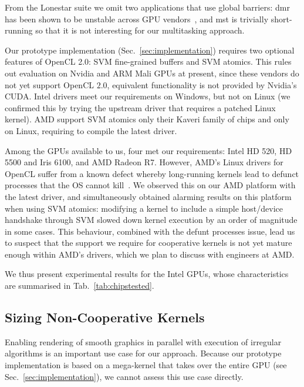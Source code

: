 \documentclass[numbers,nocopyrightspace,10pt]{sigplanconf}
\newcommand{\mytab}{Tab.~}
\newcommand{\mysec}{Sec.~}
\newcommand{\nvidia}{Nvidia\xspace}
\begin{document}
From the Lonestar suite we omit two applications that use global barriers:
dmr has been shown to be unstable across GPU vendors~\cite{DBLP:conf/iwocl/SorensenD16}, and mst is trivially short-running so that it is not
interesting for our multitasking approach.

Our prototype implementation (\mysec\ref{sec:implementation}) requires
two optional features of OpenCL 2.0: SVM fine-grained buffers and SVM
atomics. This rules out evaluation on \nvidia and ARM Mali GPUs at
present, since these vendors do not yet support OpenCL $2.0$,
equivalent functionality is not provided by \nvidia's CUDA. Intel
drivers meet our requirements on Windows, but not on Linux (we
confirmed this by trying the upstream driver that requires a patched
Linux kernel). AMD support SVM atomics only their Kaveri family of
chips and only on Linux, requiring to compile the latest driver.

Among the GPUs available to us, four met our requirements: Intel HD 520,
HD 5500 and Iris 6100, and AMD Radeon R7.  However, AMD's Linux drivers
for OpenCL suffer from a known defect whereby long-running kernels lead
to defunct processes that the OS cannot
kill~\cite{amd-defunct-process}. We observed this on our AMD platform
with the latest driver, and simultaneously obtained alarming results on
this platform when using SVM atomics: modifying a kernel to include a
simple host/device handshake through SVM slowed down kernel execution by
an order of magnitude in some cases.  This behaviour, combined with the
defunt processes issue, lead us to suspect that the support we require
for cooperative kernels is not yet mature enough within AMD's drivers,
which we plan to discuss with engineers at AMD.

We thus present experimental results for the Intel GPUs, whose characteristics are summarised in \mytab\ref{tab:chipstested}.


\subsection{Sizing Non-Cooperative Kernels}\label{sec:sizingnoncoop}

Enabling rendering of smooth graphics in parallel with execution of irregular algorithms is an important use case for our approach.  Because our prototype implementation is based on a mega-kernel that takes over the entire GPU (see \mysec\ref{sec:implementation}), we cannot assess this use case directly.
\end{document}
